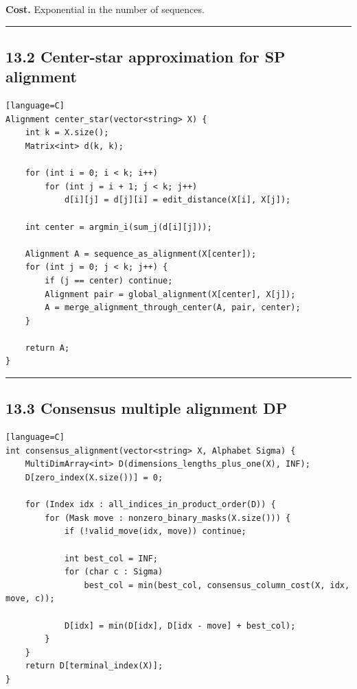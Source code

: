 \documentclass[11pt]{article}
\begin{document}
\textbf{Cost.} Exponential in the number of sequences.

\begin{center}\rule{0.5\linewidth}{0.5pt}\end{center}

\subsection{13.2 Center-star approximation for SP alignment}\label{center-star-approximation-for-sp-alignment}

\begin{verbatim}[language=C]
Alignment center_star(vector<string> X) {
    int k = X.size();
    Matrix<int> d(k, k);

    for (int i = 0; i < k; i++)
        for (int j = i + 1; j < k; j++)
            d[i][j] = d[j][i] = edit_distance(X[i], X[j]);

    int center = argmin_i(sum_j(d[i][j]));

    Alignment A = sequence_as_alignment(X[center]);
    for (int j = 0; j < k; j++) {
        if (j == center) continue;
        Alignment pair = global_alignment(X[center], X[j]);
        A = merge_alignment_through_center(A, pair, center);
    }

    return A;
}
\end{verbatim}

\begin{center}\rule{0.5\linewidth}{0.5pt}\end{center}

\subsection{13.3 Consensus multiple alignment DP}\label{consensus-multiple-alignment-dp}

\begin{verbatim}[language=C]
int consensus_alignment(vector<string> X, Alphabet Sigma) {
    MultiDimArray<int> D(dimensions_lengths_plus_one(X), INF);
    D[zero_index(X.size())] = 0;

    for (Index idx : all_indices_in_product_order(D)) {
        for (Mask move : nonzero_binary_masks(X.size())) {
            if (!valid_move(idx, move)) continue;

            int best_col = INF;
            for (char c : Sigma)
                best_col = min(best_col, consensus_column_cost(X, idx, move, c));

            D[idx] = min(D[idx], D[idx - move] + best_col);
        }
    }
    return D[terminal_index(X)];
}
\end{verbatim}
\end{document}

